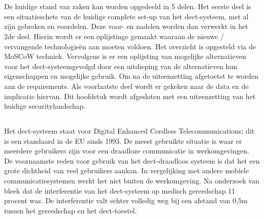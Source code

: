 \chapter{}%
\label{ch:stand-van-zaken}



De huidige stand van zaken kan worden opgedeeld in 5 delen. Het eerste deel is een situatieschets van de huidige complete set-up van het \gls{dect}-systeem, met al zijn gebreken en voordelen. Deze voor- en nadelen worden dan verwerkt in het 2de deel. Hierin wordt er een oplijstinge gemaakt waaraan de nieuwe / vervangende technologieën aan moeten voldoen. Het overzicht is opgesteld via de MoSCoW techniek. Vervolgens is er een oplijsting van mogelijke alternatieven voor het \gls{dect}-systeemgevolgd door een uitdieping van de alternatieven hun eigenschappen en mogelijke gebruik. Om na de uiteenzetting afgetoetst te worden aan de requirements. Als voorlaatste deel wordt er gekeken naar de data en de implicatie hiervan. Dit hoofdstuk wordt afgesloten met een uiteenzetting van het huidige  securitylandschap.

\section{}%
\label{sec:dect-systeem}
Het \gls{dect}-systeem staat voor Digital Enhanced Cordless Telecommunications; dit is een standaard in de EU sinds 1993. De meest gebruikte situatie is waar er meerdere gebruikers zijn voor een draadloze communicatie in werkomgevingen. De voornaamste reden voor gebruik van het \gls{dect}-draadloos systeem is dat het een grote dichtheid van veel gebruikers aankan. In vergelijking met andere mobiele communicatiesystemen werkt het niet buiten de werkomgeving. \autocite{Welinder1997} Na onderzoek van \textcite{Welinder1997} bleek dat de interferentie van het \gls{dect}-systeem op medisch gereedschap 11 procent was. De interferentie valt echter volledig weg bij een afstand van 0,5m tussen het gereedschap en het \gls{dect}-toestel.


